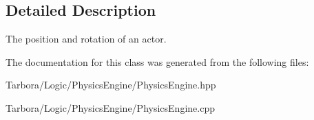 \subsection{Detailed Description}
The position and rotation of an actor. 

The documentation for this class was generated from the following files\+:\begin{DoxyCompactItemize}
\item 
Tarbora/\+Logic/\+Physics\+Engine/Physics\+Engine.\+hpp\item 
Tarbora/\+Logic/\+Physics\+Engine/Physics\+Engine.\+cpp\end{DoxyCompactItemize}
